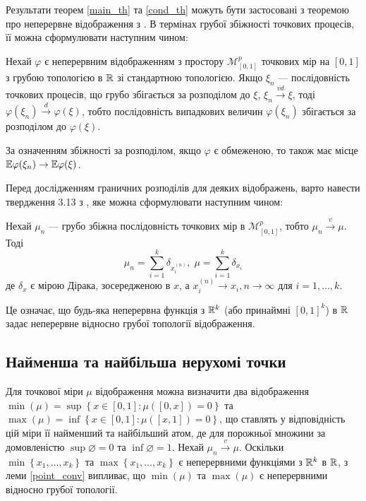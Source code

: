 Результати теорем \ref{main_th} та \ref{cond_th} можуть бути застосовані
з теоремою про неперервне відображення з \cite{Resnick_2007}. 
В термінах грубої збіжності точкових процесів, її можна сформулювати наступним чином:
\begin{theorem}\label{cmt}
    Нехай $\varphi$ є неперервним відображенням з простору
    $\mathcal{M}^p_{[0,1]}$ точкових мір на $[0,1]$
    з грубою топологією в $\mathbb{R}$ зі стандартною топологією.
    Якщо $\xi_n$ --- послідовність точкових процесів,
    що грубо збігається за розподілом до $\xi$, $\xi_n \overset{vd}{\longrightarrow} \xi$,
    тоді 
    $\varphi(\xi_n) \overset{d}{\longrightarrow} \varphi(\xi)$,
    тобто послідовність випадкових величин $\varphi(\xi_n)$ збігається за розподілом
    до $\varphi(\xi)$.
\end{theorem}
\begin{remark}
    За означенням збіжності за розподілом, якщо $\varphi$ є обмеженою, то також
    має місце
    $\mathbb{E}\varphi(\xi_n) \to \mathbb{E}\varphi(\xi)$.
\end{remark}

Перед дослідженням граничних розподілів для деяких відображень,
варто навести твердження 3.13 з \cite{Resnick_1987},
яке можна сформулювати наступним чином:
\begin{lemma}\label{point_conv}
    Нехай $\mu_n$ --- грубо збіжна послідовність точкових мір в $\mathcal{M}^p_{[0,1]}$, тобто $\mu_n \overset{v}{\longrightarrow} \mu$.
    Тоді
    \begin{equation*}
        \mu_n = \sum_{i=1}^k \delta_{x_i^{(n)}}, \;
        \mu = \sum_{i=1}^k \delta_{x_i}
    \end{equation*} 
    де $\delta_x$ є мірою Дірака, зосередженою в $x$,
    а $x_i^{(n)} \to x_i, n\to\infty$ для $i=1,\dots,k$.
\end{lemma}
Це означає, що будь-яка неперервна функція 
з $\mathbb{R}^k$ (або принаймні $[0, 1]^k$) в $\mathbb{R}$ задає
неперервне відносно грубої топології відображення.

\subsection{Найменша та найбільша нерухомі точки}
Для точкової міри $\mu$ відображення можна визначити два відображення
$\min(\mu) = \sup \left\{x\in[0,1] :\mu([0, x]) = 0 \right\}$ 
та $\max(\mu) = \inf \left\{x\in[0,1] :\mu([x, 1]) = 0 \right\}$, що ставлять у відповідність
цій міри її найменший та найбільший атом, де для порожньої множини
за домовленістю $\sup \varnothing = 0$ та $\inf \varnothing = 1$.
Нехай $\mu_n \overset{v}{\longrightarrow} \mu$.
Оскільки $\min\left\{x_1,\dots,x_k \right\}$ та
$\max\left\{x_1,\dots,x_k \right\}$ є неперервними функціями з $\mathbb{R}^k$ в $\mathbb{R}$, 
з леми \ref{point_conv}
випливає, що $\min(\mu)$ та $\max(\mu)$ 
є неперервними відносно грубої топології.

